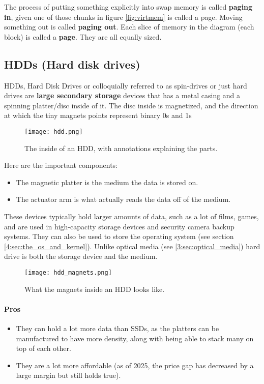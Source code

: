 \documentclass[../main.tex]{subfiles}
\begin{document}
The process of putting something explicitly into swap memory is called \textbf{paging in}, given one of those chunks in figure \ref{fig:virtmem} is called a page. Moving something out is called \textbf{paging out}. Each slice of memory in the diagram (each block) is called a \textbf{page}. They are all equally sized.

\subsection{HDDs (Hard disk drives)}

HDDs, Hard Disk Drives or colloquially referred to as spin-drives or just hard drives are \textbf{large secondary storage} devices that has a metal casing and a spinning platter/disc inside of it. The disc inside is magnetized, and the direction at which the tiny magnets points represent binary 0s and 1s

\begin{figure}[H]
    \centering
    \texttt{[image: hdd.png]}
    \caption{The inside of an HDD, with annotations explaining the parts.}
    \label{fig:hdd}
\end{figure}

Here are the important components:

\begin{itemize}
    \item The magnetic platter is the medium the data is stored on.
    \item The actuator arm is what actually reads the data off of the medium.
\end{itemize}

These devices typically hold larger amounts of data, such as a lot of films, games, and are used in high-capacity storage devices and security camera backup systems. They can also be used to store the operating system (see section \ref{4:sec:the_os_and_kernel}). Unlike optical media (see \ref{3:sec:optical_media}) hard drive is both the storage device and the medium.

\begin{figure}[H]
    \centering
    \texttt{[image: hdd\_magnets.png]}
    \caption{What the magnets inside an HDD looks like.}
    \label{fig:hdd_magnets}
\end{figure}

\paragraph{Pros}
\begin{itemize}
    \item They can hold a lot more data than SSDs, as the platters can be manufactured to have more density, along with being able to stack many on top of each other.
    \item They are a lot more affordable (as of 2025, the price gap has decreased by a large margin but still holds true).
\end{itemize}
\end{document}
